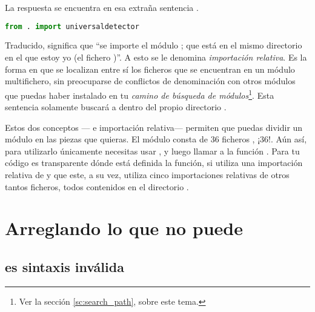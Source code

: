 La respuesta se encuentra en esa extraña sentencia .

\begin{lstlisting}[language=Python,breaklines=true]
from . import universaldetector
\end{lstlisting}

Traducido, significa que ``se importe el módulo ; que está en el mismo directorio en el que estoy yo (el fichero )''. A esto se le denomina \emph{importación relativa}. Es la forma en que se localizan entre sí los ficheros que se encuentran en un módulo multifichero, sin preocuparse de conflictos de denominación con otros módulos que puedas haber instalado en tu \emph{camino de búsqueda de módulos}\footnote{Ver la sección \ref{sc:search_path}, sobre este tema.}. Esta sentencia  solamente buscará a  dentro del propio directorio .

Estos dos conceptos --- e importación relativa--- permiten que puedas dividir un módulo en las piezas que quieras. El módulo  consta de 36 ficheros , ¡36!. Aún así, para utilizarlo únicamente necesitas usar , y luego llamar a la función . Para tu código es transparente dónde está definida la función, si utiliza una importación relativa de  y que este, a su vez, utiliza cinco importaciones relativas de otros tantos ficheros, todos contenidos en el directorio .


\section{Arreglando lo que  no puede}

\subsection{ es sintaxis inválida}


